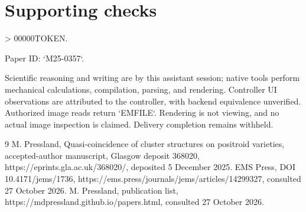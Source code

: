 \documentclass[10pt]{article}
\begin{document}
\section*{Supporting checks}
> 00000TOKEN.\par
Paper ID: `M25-0357`.\par
Scientific reasoning and writing are by this assistant session; native tools perform mechanical calculations, compilation, parsing, and rendering. Controller UI observations are attributed to the controller, with backend equivalence unverified. Authorized image reads return `EMFILE`. Rendering is not viewing, and no actual image inspection is claimed. Delivery completion remains withheld.\par
9 M. Pressland, Quasi-coincidence of cluster structures on positroid varieties, accepted-author manuscript, Glasgow deposit 368020, https://eprints.gla.ac.uk/368020/, deposited 5 December 2025. EMS Press, DOI 10.4171/jems/1736, https://ems.press/journals/jems/articles/14299327, consulted 27 October 2026. M. Pressland, publication list, https://mdpressland.github.io/papers.html, consulted 27 October 2026.\par
\end{document}
